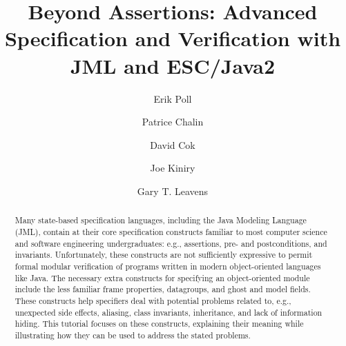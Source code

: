 \documentclass{llncs}
\begin{document}
\title{Beyond Assertions: 
       Advanced Specification and Verification with JML and ESC/Java2}

\author{Erik Poll
        \and Patrice Chalin
        \and David Cok
        \and Joe Kiniry
        \and Gary T. Leavens 
       }




\newcommand{\MARGIN}[1]{}
\newcommand{\COMMENT}[1]{}
\newcommand{\GMARGIN}[1]{\MARGIN{\textcolor{blue}{\sf\scriptsize #1}}}

\newcommand{\figref}[1]{\figurename~\ref{#1}}
\newcommand{\secref}[1]{Section~\ref{#1}}

\newcommand{\extracite}[1]{} %

\maketitle

\begin{abstract}
Many state-based specification languages, including the Java Modeling Language
(JML), contain at their core specification constructs familiar to most
computer science and software engineering undergraduates: e.g., assertions,
pre- and postconditions, and invariants.  Unfortunately, these constructs are
not sufficiently expressive to permit formal modular verification of programs
written in modern object-oriented languages like Java. The necessary extra
constructs for specifying an object-oriented module include the less familiar
frame properties, datagroups, and ghost and model fields.  These constructs
help specifiers deal with potential problems related to, e.g., unexpected side
effects, aliasing, class invariants, inheritance, and lack of information
hiding.
%
This tutorial focuses on these constructs, explaining their meaning while
illustrating how they can be used to address the stated problems.
\end{abstract}
\end{document}
